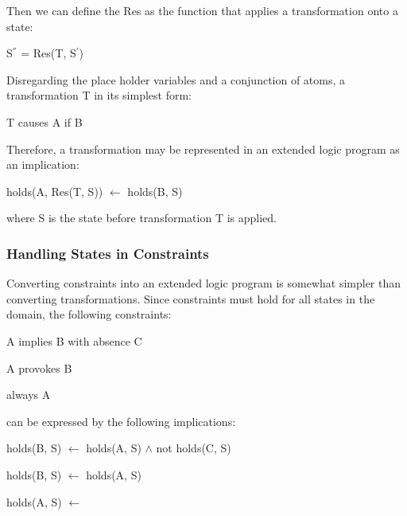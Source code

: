 \documentclass[a4paper,draft]{article}
\begin{document}
        Then we can define the Res as the function that applies a 
        transformation onto a state:
  
        \begin{list}{}{}
          \item S$^{''}$ = Res(T, S$^{'}$)
        \end{list}
  
        Disregarding the place holder variables and a conjunction of atoms, 
        a transformation T in its simplest form:
  
        \begin{list}{}{}
          \item T causes A if B
        \end{list}
  
        Therefore, a transformation may be represented in an extended logic
        program as an implication:
 
        \begin{list}{}{}
          \item holds(A, Res(T, S)) $\leftarrow$ holds(B, S)
        \end{list}

        where S is the state before transformation T is applied.

      \subsubsection{Handling States in Constraints}

        Converting constraints into an extended logic program is somewhat
        simpler than converting transformations. Since constraints must hold
        for all states in the domain, the following constraints:

      \begin{list}{}{}
        \item A implies B with absence C
        \item A provokes B
        \item always A
      \end{list}

        can be expressed by the following implications:

        \begin{list}{}{}
          \item 
            holds(B, S) $\leftarrow$ holds(A, S) $\land$ not holds(C, S)
          \item 
            holds(B, S) $\leftarrow$ holds(A, S)
          \item 
            holds(A, S) $\leftarrow$
        \end{list}
\end{document}

